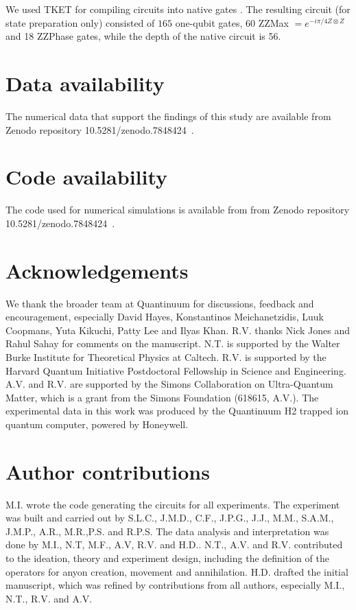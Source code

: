 \documentclass[nofootinbib,pra,twocolumn,showpacs,superscriptaddress,notitlepage,amsmath]{revtex4-2} %
\begin{document}
We used TKET for compiling circuits into native gates \cite{sivarajah_tket_2021}. The resulting circuit (for state preparation only) consisted of $165$ one-qubit gates, 60 ZZMax $= e^{-i\pi/4Z\otimes Z}$ and 18 ZZPhase gates, while the depth of the native circuit is 56.


\section*{Data availability}
The numerical data that support the findings of this study are available from Zenodo repository 10.5281/zenodo.7848424~\cite{iqbal_supporting_2023}.

\section*{Code availability}
The code used for numerical simulations is available from from Zenodo repository 10.5281/zenodo.7848424~\cite{iqbal_supporting_2023}.

\section*{Acknowledgements}
We thank the broader team at Quantinuum for discussions,  feedback and encouragement, especially David Hayes, Konstantinos Meichanetzidis, Luuk Coopmans, Yuta Kikuchi, Patty Lee and Ilyas Khan. R.V. thanks Nick Jones and Rahul Sahay for comments on the manuscript.
N.T. is supported by the Walter Burke Institute for Theoretical Physics at Caltech. R.V. is supported by the Harvard Quantum Initiative Postdoctoral Fellowship in Science and Engineering. A.V. and R.V. are supported by the Simons Collaboration on Ultra-Quantum Matter, which is a grant from the Simons Foundation (618615, A.V.). The experimental data in this work was produced by the Quantinuum H2 trapped ion quantum computer, powered by Honeywell.


\section*{Author contributions}
M.I. wrote the code generating the circuits for all experiments. The experiment was built and carried out by S.L.C., J.M.D., C.F., J.P.G., J.J., M.M., S.A.M., J.M.P., A.R., M.R.,P.S. and R.P.S. 
The data analysis and interpretation was done by M.I., N.T, M.F., A.V, R.V. and H.D.. N.T., A.V. and R.V. contributed to the ideation, theory and experiment design, including the definition of the operators for anyon creation, movement and annihilation. H.D. drafted the initial manuscript, which was refined by contributions from all authors, especially M.I., N.T., R.V. and A.V.
\end{document}
